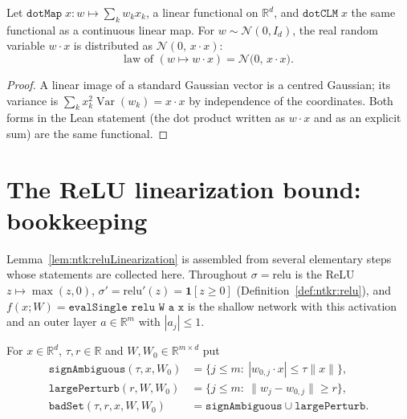 \begin{lemma}\label{lem:ntkhelp:rowProjection}
  \leanok
Let $\texttt{dotMap}\;x:w\mapsto\sum_kw_kx_k$, a linear functional on $\mathbb R^d$, and $\texttt{dotCLM}\;x$ the same functional as a continuous linear map. For $w\sim\mathcal N(0,I_d)$, the real random variable $w\cdot x$ is distributed as $\mathcal N(0,\,x\cdot x)$:
\[
  \text{law of }(w\mapsto w\cdot x)=\mathcal N\bigl(0,\,x\cdot x\bigr).
\]
\end{lemma}

\begin{proof}
  \leanok
A linear image of a standard Gaussian vector is a centred Gaussian; its variance is $\sum_kx_k^2\operatorname{Var}(w_k)=x\cdot x$ by independence of the coordinates. Both forms in the Lean statement (the dot product written as $w\cdot x$ and as an explicit sum) are the same functional.
\end{proof}


\section{The ReLU linearization bound: bookkeeping}\label{sec:ntkhelp:relu}

Lemma~\ref{lem:ntk:reluLinearization} is assembled from several elementary steps whose statements are collected here. Throughout $\sigma=\mathrm{relu}$ is the ReLU $z\mapsto\max(z,0)$, $\sigma'=\mathrm{relu}'(z)=\mathbf 1[z\ge0]$ (Definition~\ref{def:ntkr:relu}), and $f(x;W)=\texttt{evalSingle relu W a x}$ is the shallow network with this activation and an outer layer $a\in\mathbb R^m$ with $|a_j|\le1$.

\begin{definition}\label{def:ntkhelp:badSets}
  \leanok
For $x\in\mathbb R^d$, $\tau,r\in\mathbb R$ and $W,W_0\in\mathbb R^{m\times d}$ put
\begin{align*}
  \texttt{signAmbiguous}(\tau,x,W_0)&=\bigl\{j\le m:\ |w_{0,j}\cdot x|\le\tau\|x\|\bigr\},\\
  \texttt{largePerturb}(r,W,W_0)&=\bigl\{j\le m:\ \|w_j-w_{0,j}\|\ge r\bigr\},\\
  \texttt{badSet}(\tau,r,x,W,W_0)&=\texttt{signAmbiguous}\cup\texttt{largePerturb}.
\end{align*}
\end{definition}

